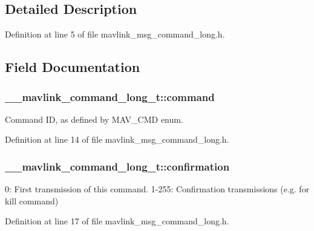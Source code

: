 \subsection{Detailed Description}


Definition at line 5 of file mavlink\-\_\-msg\-\_\-command\-\_\-long.\-h.



\subsection{Field Documentation}
\hypertarget{struct____mavlink__command__long__t_a059e44ecfa8fbb9f11543a81145265cf}{
\subsubsection[{command}]{ \-\_\-\-\_\-mavlink\-\_\-command\-\_\-long\-\_\-t\-::command}}\label{struct____mavlink__command__long__t_a059e44ecfa8fbb9f11543a81145265cf}


Command I\-D, as defined by M\-A\-V\-\_\-\-C\-M\-D enum. 



Definition at line 14 of file mavlink\-\_\-msg\-\_\-command\-\_\-long.\-h.

\hypertarget{struct____mavlink__command__long__t_a79ec42e9308bf4cc44c64ae939fe1d61}{
\subsubsection[{confirmation}]{ \-\_\-\-\_\-mavlink\-\_\-command\-\_\-long\-\_\-t\-::confirmation}}\label{struct____mavlink__command__long__t_a79ec42e9308bf4cc44c64ae939fe1d61}


0\-: First transmission of this command. 1-\/255\-: Confirmation transmissions (e.\-g. for kill command) 



Definition at line 17 of file mavlink\-\_\-msg\-\_\-command\-\_\-long.\-h.

